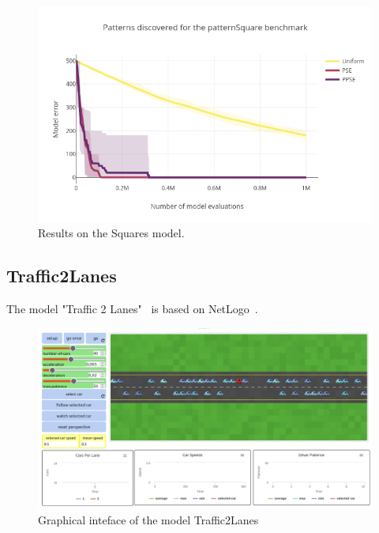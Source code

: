 \documentclass[10pt,letterpaper]{article}
\theoremstyle{definition}
\theoremstyle{remark}
\begin{document}
\begin{figure}
    \centering
    \includegraphics[width=0.9\linewidth]{images/plot_patternSquare.png}
    \caption{Results on the Squares model. }
    \label{fig:plot_squares}
\end{figure}





\subsection*{Traffic2Lanes}

The model "Traffic 2 Lanes"~\cite{wilensky1998netlogo} is based on NetLogo~\cite{wilensky1999netlogo}.

\begin{figure}
    \centering
    \includegraphics[width=1.0\linewidth]{images/traffic2lanes.png}
    \caption{Graphical inteface of the model Traffic2Lanes}
    \label{fig:traffic2lanes}
\end{figure}
\end{document}
